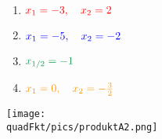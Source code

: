 \begin{Answer}[ref=produktformNullstellenA2]

	\begin{minipage}{\textwidth}
		\begin{minipage}{0.5\textwidth}
			\begin{enumerate}[label=\alph*)]
				\item \(\textcolor{red}{x_1=-3,\quad x_2=2}\)
				\item \(\textcolor{blue}{x_1=-5,\quad x_2=-2}\)
			\end{enumerate}
		\end{minipage}%
		\begin{minipage}{0.5\textwidth}
			\begin{enumerate}[label=\alph*)]
				\setcounter{enumi}{2}
				\item \(\textcolor{ForestGreen}{x_{1/2}=-1}\)
				\item \(\textcolor{YellowOrange}{x_1=0,\quad x_2=-\frac{3}{2}}\)
			\end{enumerate}
		\end{minipage}%
	\end{minipage}%

	\bigskip

	\texttt{[image: \\quadFkt/pics/produktA2.png]}
\end{Answer}